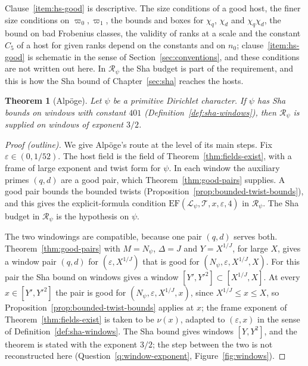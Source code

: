 \documentclass[11pt]{amsbook}
\theoremstyle{plain}
\newtheorem{theorem}{Theorem}[section]
\theoremstyle{definition}
\theoremstyle{remark}
\numberwithin{equation}{section}
\numberwithin{figure}{chapter}
\numberwithin{table}{chapter}
\newcommand{\eps}{\varepsilon}
\newcommand{\lev}{\mathscr{L}}
\newcommand{\Top}{\mathcal{T}}
\begin{document}
\noindent Clause~\ref{item:hs-good} is descriptive. The size conditions of a
good
host, the finer size conditions on $\varpi_0,\varpi_1$, the bounds and boxes
for $\chi_q$, $\chi_d$ and
$\chi_q\chi_d$, the bound on bad Frobenius classes, the validity of
ranks at a scale and the constant $C_5$ of a host for given ranks
depend on the constants and on $n_0$; clause~\ref{item:hs-good} is
schematic in the sense of Section~\ref{sec:conventions}, and these
conditions
are not written out here. In $\mathscr R_\psi$ the Sha budget is part
of the requirement, and this is how the Sha bound of
Chapter~\ref{sec:sha} reaches the hosts.

\begin{theorem}[Alp\"oge]\label{thm:host-supply}
Let $\psi$ be a primitive Dirichlet character. If $\psi$ has Sha
bounds on windows with constant $401$
(Definition~\ref{def:sha-windows}), then
$\mathscr R_\psi$ is supplied on windows of exponent $3/2$.
\end{theorem}

\begin{proof}[Proof (outline)]
We give Alp\"oge's route at the level of its main steps.
Fix $\eps\in(0,1/52)$. The host field is the field of
Theorem~\ref{thm:fields-exist}, with a frame of large exponent and
twist form for $\psi$. In each window the auxiliary primes $(q,d)$
are a good pair, which Theorem~\ref{thm:good-pairs} supplies. A good
pair bounds the bounded twists
(Proposition~\ref{prop:bounded-twist-bounds}), and this gives the
explicit-formula condition $\mathrm{EF}(\lev_\psi,\Top,x,\eps,4)$ in
$\mathscr R_\psi$. The Sha budget in
$\mathscr R_\psi$ is the hypothesis on $\psi$.

The two windowings are compatible, because one pair $(q,d)$ serves
both. Theorem~\ref{thm:good-pairs} with $M=N_\psi$, $\Delta=J$ and
$Y=X^{1/J}$, for large $X$, gives a window pair $(q,d)$ for
$(\eps,X^{1/J})$ that is good for $(N_\psi,\eps,X^{1/J},X)$. For this
pair the Sha bound on windows gives a window $[Y',Y'^2]\subset
[X^{1/J},X]$. At every $x\in[Y',Y'^2]$ the pair is good for
$(N_\psi,\eps,X^{1/J},x)$, since $X^{1/J}\le x\le X$, so
Proposition~\ref{prop:bounded-twist-bounds} applies at $x$; the frame
exponent of Theorem~\ref{thm:fields-exist} is taken to be $\nu(x)$,
adapted to $(\eps,x)$ in the sense of Definition~\ref{def:sha-windows}. The Sha
bound gives
windows $[Y,Y^2]$, and the theorem is stated with the exponent
$3/2$; the step between the two is not reconstructed here
(Question~\ref{q:window-exponent}, Figure~\ref{fig:windows}).
\end{proof}
\end{document}
